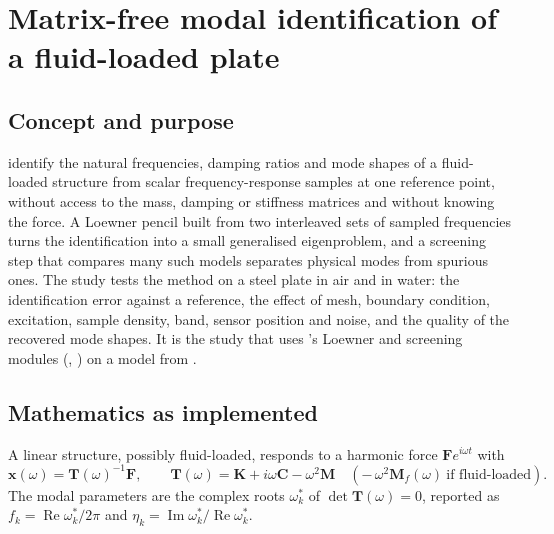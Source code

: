 \section{Matrix-free modal identification of a fluid-loaded plate}\label{sec:vf-fsi}

\subsection*{Concept and purpose}

\citet{liu2026fsi} identify the natural frequencies, damping ratios and mode shapes of a fluid-loaded structure from scalar frequency-response samples at one reference point, without access to the mass, damping or stiffness matrices and without knowing the force. A Loewner pencil built from two interleaved sets of sampled frequencies turns the identification into a small generalised eigenproblem, and a screening step that compares many such models separates physical modes from spurious ones. The study tests the method on a steel plate in air and in water: the identification error against a reference, the effect of mesh, boundary condition, excitation, sample density, band, sensor position and noise, and the quality of the recovered mode shapes. It is the study that uses \rom{}'s Loewner and screening modules (, ) on a model from \fea{}.

\subsection*{Mathematics as implemented}

A linear structure, possibly fluid-loaded, responds to a harmonic force $\mathbf Fe^{i\omega t}$ with
\begin{equation}\label{eq:fsi-frf}
\mathbf x(\omega)=\mathbf T(\omega)^{-1}\mathbf F,\qquad\mathbf T(\omega)=\mathbf K+i\omega\mathbf C-\omega^2\mathbf M\quad(-\,\omega^2\mathbf M_f(\omega)\ \text{if fluid-loaded}).
\end{equation}
The modal parameters are the complex roots $\omega_k^\ast$ of $\det\mathbf T(\omega)=0$, reported as $f_k=\operatorname{Re}\omega_k^\ast/2\pi$ and $\eta_k=\operatorname{Im}\omega_k^\ast/\operatorname{Re}\omega_k^\ast$.

